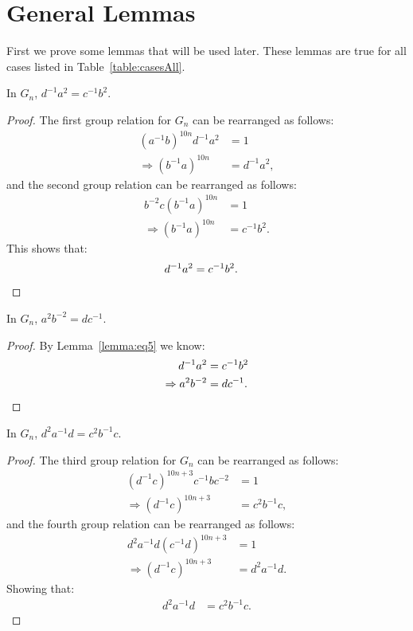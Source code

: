 \section{General Lemmas}
\label{section:generalLemmas}

\noindent{}First we prove some lemmas that will be used later. These lemmas are true for all cases listed in Table~\ref{table:casesAll}.

\begin{lemma} In $G_n$, $d^{-1}a^{2}=c^{-1}b^{2}$.
\label{lemma:eq5}
\end{lemma}
\begin{proof} The first group relation for $G_n$ can be rearranged as follows:
\begin{align}
(a^{-1}b)^{10n}d^{-1}a^{2}&=1\nonumber{}\\
\Rightarrow{}(b^{-1}a)^{10n}&=d^{-1}a^{2},\label{eq1:2}
\end{align}
and the second group relation can be rearranged as follows:
\begin{align}
b^{-2}c(b^{-1}a)^{10n}&=1\nonumber{}\\
\Rightarrow{}(b^{-1}a)^{10n}&=c^{-1}b^{2}.\label{eq2:2}
\end{align}
This shows that:
\begin{align*}
d^{-1}a^{2}&=c^{-1}b^{2}.\qedhere
\end{align*}
\end{proof}

\begin{corollary} In $G_n$, $a^{2}b^{-2}=dc^{-1}$.
\label{corollary:eq6}
\end{corollary}
\begin{proof}By Lemma~\ref{lemma:eq5} we know:
\begin{align*}
d^{-1}a^{2}&=c^{-1}b^{2}\\
\Rightarrow{}a^{2}b^{-2}&=dc^{-1}.\qedhere
\end{align*}
\end{proof}

\begin{lemma} In $G_n$, $d^{2}a^{-1}d=c^{2}b^{-1}c$.
\label{lemma:eq7}
\end{lemma}
\begin{proof}
The third group relation for $G_n$ can be rearranged as follows:
\begin{align*}
(d^{-1}c)^{10n+3}c^{-1}bc^{-2}&=1\\
\Rightarrow{}(d^{-1}c)^{10n+3}&=c^{2}b^{-1}c,
\end{align*}
and the fourth group relation can be rearranged as follows:
\begin{align*}
d^{2}a^{-1}d(c^{-1}d)^{10n+3}&=1\\
\Rightarrow{}(d^{-1}c)^{10n+3}&=d^{2}a^{-1}d.
\end{align*}
Showing that:
\begin{align}
\label{eq7}d^{2}a^{-1}d&=c^{2}b^{-1}c.
\end{align}
\end{proof}

